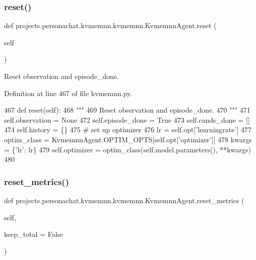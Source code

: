 \subsubsection{\texorpdfstring{reset()}{reset()}}
{\footnotesize\ttfamily def projects.\+personachat.\+kvmemnn.\+kvmemnn.\+Kvmemnn\+Agent.\+reset (\begin{DoxyParamCaption}\item[{}]{self }\end{DoxyParamCaption})}

\begin{DoxyVerb}Reset observation and episode_done.
\end{DoxyVerb}
 

Definition at line 467 of file kvmemnn.\+py.


\begin{DoxyCode}
467     \textcolor{keyword}{def }reset(self):
468         \textcolor{stringliteral}{"""}
469 \textcolor{stringliteral}{        Reset observation and episode\_done.}
470 \textcolor{stringliteral}{        """}
471         self.observation = \textcolor{keywordtype}{None}
472         self.episode\_done = \textcolor{keyword}{True}
473         self.cands\_done = []
474         self.history = \{\}
475         \textcolor{comment}{# set up optimizer}
476         lr = self.opt[\textcolor{stringliteral}{'learningrate'}]
477         optim\_class = KvmemnnAgent.OPTIM\_OPTS[self.opt[\textcolor{stringliteral}{'optimizer'}]]
478         kwargs = \{\textcolor{stringliteral}{'lr'}: lr\}
479         self.optimizer = optim\_class(self.model.parameters(), **kwargs)
480 
\end{DoxyCode}
\mbox{\label{classprojects_1_1personachat_1_1kvmemnn_1_1kvmemnn_1_1KvmemnnAgent_ad4f013360fde46e2974fcf0f65a99e3d}} 
\subsubsection{\texorpdfstring{reset\+\_\+metrics()}{reset\_metrics()}}
{\footnotesize\ttfamily def projects.\+personachat.\+kvmemnn.\+kvmemnn.\+Kvmemnn\+Agent.\+reset\+\_\+metrics (\begin{DoxyParamCaption}\item[{}]{self,  }\item[{}]{keep\+\_\+total = {\ttfamily False} }\end{DoxyParamCaption})}



